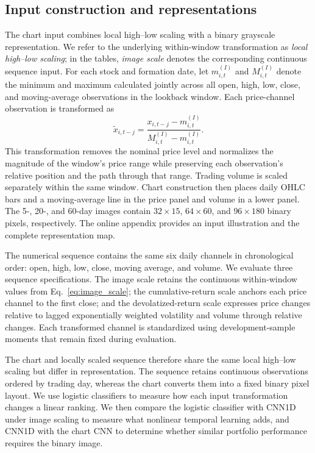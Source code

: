 \subsection{Input construction and representations}\label{subsec:representation_design}

The chart input combines local high--low scaling with a binary grayscale representation. We refer to the underlying within-window transformation as \emph{local high--low scaling}; in the tables, \emph{image scale} denotes the corresponding continuous sequence input. For each stock and formation date, let $m_{i,t}^{(I)}$ and $M_{i,t}^{(I)}$ denote the minimum and maximum calculated jointly across all open, high, low, close, and moving-average observations in the lookback window. Each price-channel observation is transformed as
\begin{equation}
 \widetilde{x}_{i,t-j}
 =\frac{x_{i,t-j}-m_{i,t}^{(I)}}{M_{i,t}^{(I)}-m_{i,t}^{(I)}}.
 \label{eq:image_scale}
\end{equation}
This transformation removes the nominal price level and normalizes the magnitude of the window's price range while preserving each observation's relative position and the path through that range.
Trading volume is scaled separately within the same window. Chart construction then places daily OHLC bars and a moving-average line in the price panel and volume in a lower panel. The 5-, 20-, and 60-day images contain $32\times15$, $64\times60$, and $96\times180$ binary pixels, respectively. The online appendix provides an input illustration and the complete representation map.

The numerical sequence contains the same six daily channels in chronological order: open, high, low, close, moving average, and volume. We evaluate three sequence specifications. The image scale retains the continuous within-window values from Eq.~\eqref{eq:image_scale}; the cumulative-return scale anchors each price channel to the first close; and the devolatized-return scale expresses price changes relative to lagged exponentially weighted volatility and volume through relative changes. Each transformed channel is standardized using development-sample moments that remain fixed during evaluation.

The chart and locally scaled sequence therefore share the same local high--low scaling but differ in representation. The sequence retains continuous observations ordered by trading day, whereas the chart converts them into a fixed binary pixel layout. We use logistic classifiers to measure how each input transformation changes a linear ranking. We then compare the logistic classifier with CNN1D under image scaling to measure what nonlinear temporal learning adds, and CNN1D with the chart CNN to determine whether similar portfolio performance requires the binary image.

